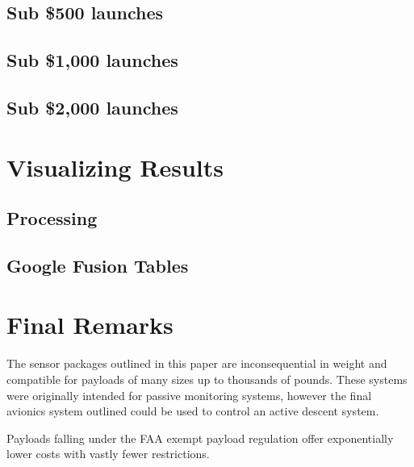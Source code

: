 \documentclass[heading.tex]{subfiles}
\begin{document}
\subsection{Sub \$500 launches}

\subsection{Sub \$1,000 launches}

\subsection{Sub \$2,000 launches}

\section{Visualizing Results}


\subsection{Processing}

\subsection{Google Fusion Tables}


\section{Final Remarks}
The sensor packages outlined in this paper are inconsequential in weight and
compatible for payloads of many sizes up to thousands of pounds. These systems
were originally intended for passive monitoring systems, however the final
avionics system outlined could be used to control an active descent system.

Payloads falling under the FAA exempt payload regulation offer exponentially
lower costs with vastly fewer restrictions. 
\end{document}
